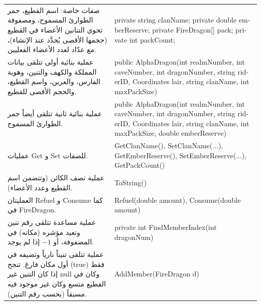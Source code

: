 \documentclass[14pt]{extarticle}
\begin{document}
\begin{enumerate}[resume, label=\textbf{تمرين \arabic*:}, wide=0pt, leftmargin=*, itemsep=2.2em]
    {\centering
    \renewcommand{\arraystretch}{1.2}
    \small
    \begin{tabular}{|>{\raggedleft\arraybackslash}p{}|>{\raggedright\arraybackslash}p{}|}
    \hline
    \multicolumn{2}{|c|}{\textbf{الفئة الفرعية: \textenglish{AlphaDragon : BasicDragon}}} \\
    \hline
    صفات خاصة: اسم القطيع، جمر الطوارئ المسموح، ومصفوفة تحوي التنانين الأعضاء في القطيع (حجمها الأقصى يُحدَّد عند الإنشاء)، مع عدّاد لعدد الأعضاء الفعليين. & \textenglish{private string clanName;} \newline \textenglish{private double emberReserve;} \newline \textenglish{private FireDragon[] pack;} \newline \textenglish{private int packCount;} \\
    \hline
    عملية بنائية أولى تتلقى بيانات المملكة والكهف والتنين، وهوية الفارس، والعرين، واسم القطيع، والحجم الأقصى للقطيع. & \textenglish{public AlphaDragon(int realmNumber, int caveNumber, int dragonNumber, string riderID, Coordinates lair, string clanName, int maxPackSize)} \\
    \hline
    عملية بنائية ثانية تتلقى أيضاً جمر الطوارئ المسموح. & \textenglish{public AlphaDragon(int realmNumber, int caveNumber, int dragonNumber, string riderID, Coordinates lair, string clanName, int maxPackSize, double emberReserve)} \\
    \hline
    عمليات \textenglish{Get} و \textenglish{Set} للصفات. & \textenglish{GetClanName(), SetClanName(...),} \newline \textenglish{GetEmberReserve(), SetEmberReserve(...), GetPackCount()} \\
    \hline
    عملية تصف الكائن (وتتضمن اسم القطيع وعدد الأعضاء). & \textenglish{ToString()} \\
    \hline
    العمليتان \textenglish{Refuel} و \textenglish{Consume} كما في \textenglish{FireDragon}. & \textenglish{Refuel(double amount), Consume(double amount)} \\
    \hline
    عملية مساعدة تتلقى رقم تنين وتعيد مؤشره (مكانه) في المصفوفة، أو $-1$ إذا لم يوجد. & \textenglish{private int FindMemberIndex(int dragonNum)} \\
    \hline
    عملية تتلقى تنيناً نارياً وتضيفه في أول مكان فارغ. تنجح (\textenglish{true}) فقط إذا كان التنين غير \textenglish{null} وكان في القطيع متسع وكان غير موجود فيه مسبقاً (بحسب رقم التنين). & \textenglish{AddMember(FireDragon d)} \\
    \hline

\end{tabular}}
\end{enumerate}
\end{document}
